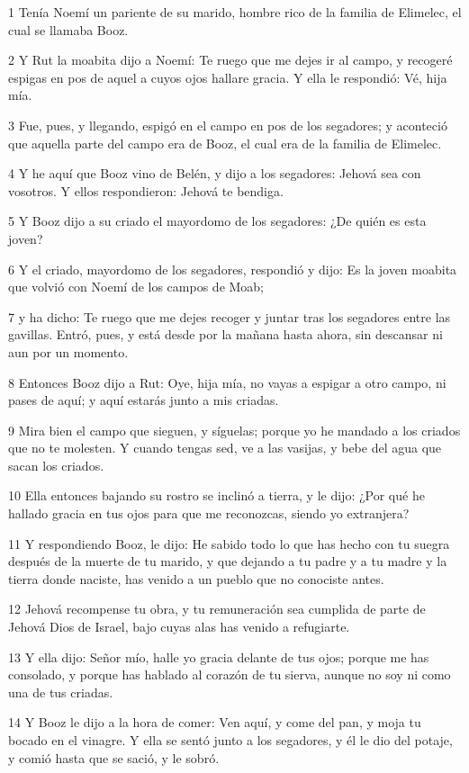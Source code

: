 \par 1 Tenía Noemí un pariente de su marido, hombre rico de la familia de Elimelec, el cual se llamaba Booz.
\par 2 Y Rut la moabita dijo a Noemí: Te ruego que me dejes ir al campo, y recogeré espigas en pos de aquel a cuyos ojos hallare gracia. Y ella le respondió: Vé, hija mía.
\par 3 Fue, pues, y llegando, espigó en el campo en pos de los segadores; y aconteció que aquella parte del campo era de Booz, el cual era de la familia de Elimelec.
\par 4 Y he aquí que Booz vino de Belén, y dijo a los segadores: Jehová sea con vosotros. Y ellos respondieron: Jehová te bendiga.
\par 5 Y Booz dijo a su criado el mayordomo de los segadores: ¿De quién es esta joven?
\par 6 Y el criado, mayordomo de los segadores, respondió y dijo: Es la joven moabita que volvió con Noemí de los campos de Moab;
\par 7 y ha dicho: Te ruego que me dejes recoger y juntar tras los segadores entre las gavillas. Entró, pues, y está desde por la mañana hasta ahora, sin descansar ni aun por un momento.
\par 8 Entonces Booz dijo a Rut: Oye, hija mía, no vayas a espigar a otro campo, ni pases de aquí; y aquí estarás junto a mis criadas.
\par 9 Mira bien el campo que sieguen, y síguelas; porque yo he mandado a los criados que no te molesten. Y cuando tengas sed, ve a las vasijas, y bebe del agua que sacan los criados.
\par 10 Ella entonces bajando su rostro se inclinó a tierra, y le dijo: ¿Por qué he hallado gracia en tus ojos para que me reconozcas, siendo yo extranjera?
\par 11 Y respondiendo Booz, le dijo: He sabido todo lo que has hecho con tu suegra después de la muerte de tu marido, y que dejando a tu padre y a tu madre y la tierra donde naciste, has venido a un pueblo que no conociste antes.
\par 12 Jehová recompense tu obra, y tu remuneración sea cumplida de parte de Jehová Dios de Israel, bajo cuyas alas has venido a refugiarte.
\par 13 Y ella dijo: Señor mío, halle yo gracia delante de tus ojos; porque me has consolado, y porque has hablado al corazón de tu sierva, aunque no soy ni como una de tus criadas.
\par 14 Y Booz le dijo a la hora de comer: Ven aquí, y come del pan, y moja tu bocado en el vinagre. Y ella se sentó junto a los segadores, y él le dio del potaje, y comió hasta que se sació, y le sobró.
